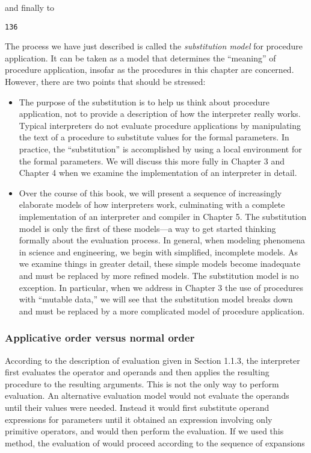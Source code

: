 and finally to

\begin{lstlisting}
136
\end{lstlisting}

The process we have just described is called the \textit{substitution model} for procedure application. It can be taken as a model that determines the ``meaning'' of procedure application, insofar as the procedures in this chapter are concerned. However, there are two points that should be stressed:

\begin{itemize}
\item The purpose of the substitution is to help us think about procedure application, not to provide a description of how the interpreter really works. Typical interpreters do not evaluate procedure applications by manipulating the text of a procedure to substitute values for the formal parameters. In practice, the ``substitution'' is accomplished by using a local environment for the formal parameters. We will discuss this more fully in Chapter 3 and Chapter 4 when we examine the implementation of an interpreter in detail.

\item Over the course of this book, we will present a sequence of increasingly elaborate models of how interpreters work, culminating with a complete implementation of an interpreter and compiler in Chapter 5. The substitution model is only the first of these models---a way to get started thinking formally about the evaluation process. In general, when modeling phenomena in science and engineering, we begin with simplified, incomplete models. As we examine things in greater detail, these simple models become inadequate and must be replaced by more refined models. The substitution model is no exception. In particular, when we address in Chapter 3 the use of procedures with ``mutable data,'' we will see that the substitution model breaks down and must be replaced by a more complicated model of procedure application.
\end{itemize}

\subsubsection{Applicative order versus normal order}

According to the description of evaluation given in Section 1.1.3, the interpreter first evaluates the operator and operands and then applies the resulting procedure to the resulting arguments. This is not the only way to perform evaluation. An alternative evaluation model would not evaluate the operands until their values were needed. Instead it would first substitute operand expressions for parameters until it obtained an expression involving only primitive operators, and would then perform the evaluation. If we used this method, the evaluation of  would proceed according to the sequence of expansions

